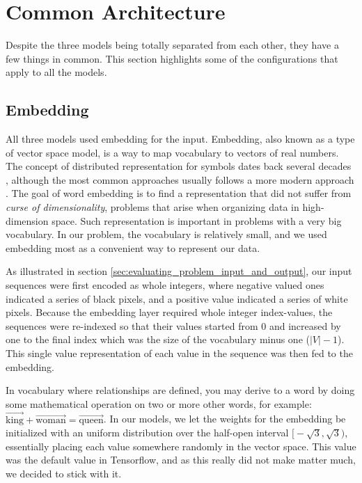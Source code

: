 \section{Common Architecture}
Despite the three models being totally separated from each other, they have a few things in common. This section highlights some of the configurations that apply to all the models.

\subsection{Embedding}
All three models used embedding for the input. Embedding, also known as a type of vector space model, is a way to map vocabulary to vectors of real numbers. The concept of distributed representation for symbols dates back several decades \citep{hinton1986learning}, although the most common approaches usually follows a more modern approach \citep{bengio2003neural}. The goal of word embedding is to find a representation that did not suffer from \emph{curse of dimensionality}, problems that arise when organizing data in high-dimension space. Such representation is important in problems with a very big vocabulary. In our problem, the vocabulary is relatively small, and we used embedding most as a convenient way to represent our data.

As illustrated in section \ref{sec:evaluating_problem_input_and_output}, our input sequences were first encoded as whole integers, where negative valued ones indicated a series of black pixels, and a positive value indicated a series of white pixels. Because the embedding layer required whole integer index-values, the sequences were re-indexed so that their values started from \(0\) and increased by one to the final index which was the size of the vocabulary minus one (\(|V| - 1\)). This single value representation of each value in the sequence was then fed to the embedding. 

In vocabulary where relationships are defined, you may derive to a word by doing some mathematical operation on two or more other words, for example:  \(\vec{\text{king}}+\vec{\text{woman}}=\vec{\text{queen}}\). In our models, we let the weights for the embedding be initialized with an uniform distribution over the half-open interval \(\big[-\sqrt{3}, \sqrt{3}\big)\), essentially placing each value somewhere randomly in the vector space. This value was the default value in Tensorflow, and as this really did not make matter much, we decided to stick with it.

